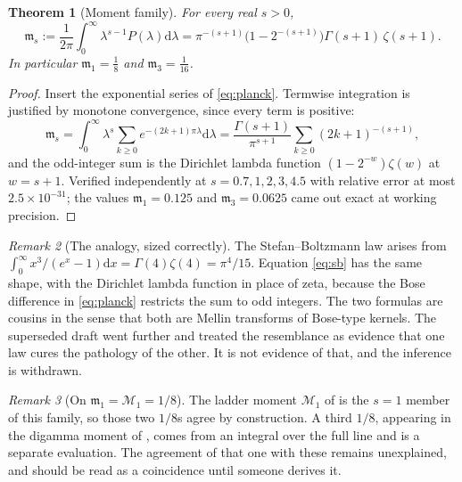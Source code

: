 \documentclass[12pt,a4paper]{article}
\theoremstyle{plain}
\newtheorem{theorem}{Theorem}[section]
\theoremstyle{definition}
\theoremstyle{remark}
\newtheorem{remark}[theorem]{Remark}
\newcommand{\dd}{\mathrm{d}}
\newcommand{\mm}{\mathfrak{m}}
\newcommand{\cM}{\mathcal{M}}
\begin{document}
\begin{theorem}[Moment family]
\label{thm:sb}
For every real $s>0$,
\begin{equation}
\mm_s:=\frac{1}{2\pi}\int_0^\infty\lambda^{s-1}P(\lambda)\dd\lambda
=\pi^{-(s+1)}\bigl(1-2^{-(s+1)}\bigr)\Gamma(s+1)\,\zeta(s+1).
\label{eq:sb}
\end{equation}
In particular $\mm_1=\tfrac18$ and $\mm_3=\tfrac{1}{16}$.
\end{theorem}

\begin{proof}
Insert the exponential series of \eqref{eq:planck}. Termwise
integration is justified by monotone convergence, since every term is
positive:
\begin{equation}
\mm_s=\int_0^\infty\lambda^s\sum_{k\ge0}e^{-(2k+1)\pi\lambda}\dd\lambda
=\frac{\Gamma(s+1)}{\pi^{s+1}}\sum_{k\ge0}(2k+1)^{-(s+1)},
\end{equation}
and the odd-integer sum is the Dirichlet lambda function
$(1-2^{-w})\zeta(w)$ at $w=s+1$. Verified independently at
$s=0.7,1,2,3,4.5$ with relative error at most $2.5\times10^{-31}$; the
values $\mm_1=0.125$ and $\mm_3=0.0625$ came out exact at working
precision.
\end{proof}

\begin{remark}[The analogy, sized correctly]
The Stefan--Boltzmann law arises from $\int_0^\infty
x^3/(e^x-1)\dd x=\Gamma(4)\zeta(4)=\pi^4/15$. Equation \eqref{eq:sb}
has the same shape, with the Dirichlet lambda function in place of
zeta, because the Bose difference in \eqref{eq:planck} restricts the
sum to odd integers. The two formulas are cousins in the sense that
both are Mellin transforms of Bose-type kernels. The superseded draft
went further and treated the resemblance as evidence that one law cures
the pathology of the other. It is not evidence of that, and the
inference is withdrawn.
\end{remark}

\begin{remark}[On $\mm_1=\cM_1=1/8$]
The ladder moment $\cM_1$ of \cite{ToupinSpectral} is the $s=1$ member
of this family, so those two $1/8$s agree by construction. A third
$1/8$, appearing in the digamma moment of \cite{ToupinBlocks}, comes
from an integral over the full line and is a separate evaluation. The
agreement of that one with these remains unexplained, and should be
read as a coincidence until someone derives it.
\end{remark}
\end{document}
